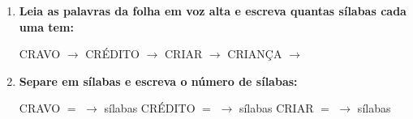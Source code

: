 \begin{exercicio}
\begin{enumerate}[resume]
  \item \textbf{Leia as palavras da folha em voz alta e escreva quantas sílabas cada uma tem:}

  \begin{center}
  CRAVO $\rightarrow$ \underline{\hspace{1cm}} \quad CRÉDITO $\rightarrow$ \underline{\hspace{1cm}} \quad CRIAR $\rightarrow$ \underline{\hspace{1cm}} \quad CRIANÇA $\rightarrow$ \underline{\hspace{1cm}}
  \end{center}

  \item \textbf{Separe em sílabas e escreva o número de sílabas:}
  \begin{center}
  CRAVO $=$ \underline{\hspace{1.2cm}} $\rightarrow$ \underline{\hspace{0.8cm}} sílabas \quad CRÉDITO $=$ \underline{\hspace{1.2cm}} $\rightarrow$ \underline{\hspace{0.8cm}} sílabas \quad CRIAR $=$ \underline{\hspace{1.2cm}} $\rightarrow$ \underline{\hspace{0.8cm}} sílabas
  \end{center}

\end{enumerate}

\end{exercicio}



